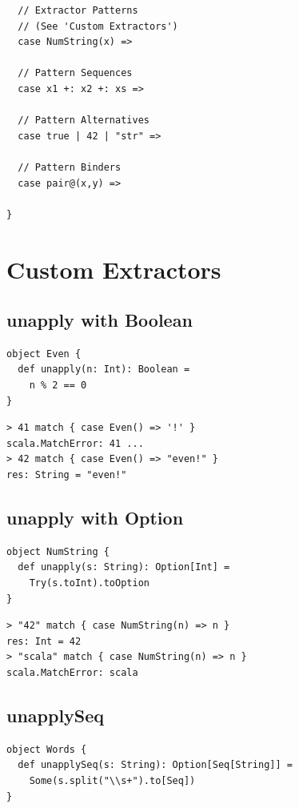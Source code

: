\documentclass[10pt,landscape,a4paper]{article}
\begin{document}
\begin{multicols*}{4}
\begin{verbatim}
  // Extractor Patterns
  // (See 'Custom Extractors')
  case NumString(x) =>

  // Pattern Sequences
  case x1 +: x2 +: xs =>

  // Pattern Alternatives
  case true | 42 | "str" =>

  // Pattern Binders
  case pair@(x,y) =>

}
\end{verbatim}

  \section{Custom Extractors}

  \subsection{unapply with Boolean}

\begin{verbatim}
object Even {
  def unapply(n: Int): Boolean =
    n % 2 == 0
}
\end{verbatim}

\begin{verbatim}
> 41 match { case Even() => '!' }
scala.MatchError: 41 ...
> 42 match { case Even() => "even!" }
res: String = "even!"
\end{verbatim}

  \subsection{unapply with Option}

\begin{verbatim}
object NumString {
  def unapply(s: String): Option[Int] =
    Try(s.toInt).toOption
}
\end{verbatim}

\begin{verbatim}
> "42" match { case NumString(n) => n }
res: Int = 42
> "scala" match { case NumString(n) => n }
scala.MatchError: scala
\end{verbatim}

  \subsection{unapplySeq}

\begin{verbatim}
object Words {
  def unapplySeq(s: String): Option[Seq[String]] =
    Some(s.split("\\s+").to[Seq])
}
\end{verbatim}


\end{multicols*}
\end{document}
